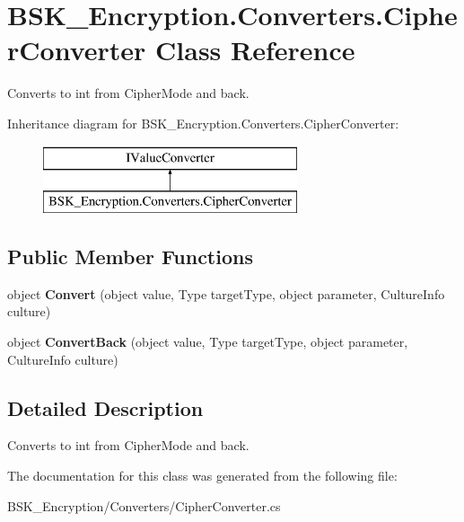 \hypertarget{class_b_s_k___encryption_1_1_converters_1_1_cipher_converter}{}\section{B\+S\+K\+\_\+\+Encryption.\+Converters.\+Cipher\+Converter Class Reference}
\label{class_b_s_k___encryption_1_1_converters_1_1_cipher_converter}


Converts to int from Cipher\+Mode and back.  


Inheritance diagram for B\+S\+K\+\_\+\+Encryption.\+Converters.\+Cipher\+Converter\+:\begin{figure}[H]
\begin{center}
\leavevmode
\includegraphics[height=2.000000cm]{class_b_s_k___encryption_1_1_converters_1_1_cipher_converter}
\end{center}
\end{figure}
\subsection*{Public Member Functions}
\begin{DoxyCompactItemize}
\item 
\mbox{\label{class_b_s_k___encryption_1_1_converters_1_1_cipher_converter_a36010c8380c5fe2fa1285f745ce0f171}} 
object {\bfseries Convert} (object value, Type target\+Type, object parameter, Culture\+Info culture)
\item 
\mbox{\label{class_b_s_k___encryption_1_1_converters_1_1_cipher_converter_aabade14f9218f1529b63e3c4c0cc0608}} 
object {\bfseries Convert\+Back} (object value, Type target\+Type, object parameter, Culture\+Info culture)
\end{DoxyCompactItemize}


\subsection{Detailed Description}
Converts to int from Cipher\+Mode and back. 



The documentation for this class was generated from the following file\+:\begin{DoxyCompactItemize}
\item 
B\+S\+K\+\_\+\+Encryption/\+Converters/Cipher\+Converter.\+cs\end{DoxyCompactItemize}

